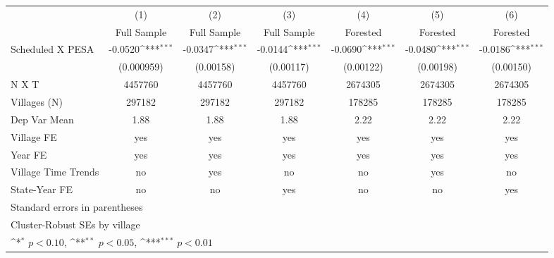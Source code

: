 {
\def\sym#1{\ifmmode^{#1}\else\(^{#1}\)\fi}
\begin{tabular}{l*{6}{c}}
\hline\hline
                    &\multicolumn{1}{c}{(1)}&\multicolumn{1}{c}{(2)}&\multicolumn{1}{c}{(3)}&\multicolumn{1}{c}{(4)}&\multicolumn{1}{c}{(5)}&\multicolumn{1}{c}{(6)}\\
                    &\multicolumn{1}{c}{Full Sample}&\multicolumn{1}{c}{Full Sample}&\multicolumn{1}{c}{Full Sample}&\multicolumn{1}{c}{Forested}&\multicolumn{1}{c}{Forested}&\multicolumn{1}{c}{Forested}\\
\hline
Scheduled X PESA &     -0.0520\sym{***}&     -0.0347\sym{***}&     -0.0144\sym{***}&     -0.0690\sym{***}&     -0.0480\sym{***}&     -0.0186\sym{***}\\
                    &  (0.000959)         &   (0.00158)         &   (0.00117)         &   (0.00122)         &   (0.00198)         &   (0.00150)         \\
\hline
N X T               &     4457760         &     4457760         &     4457760         &     2674305         &     2674305         &     2674305         \\
Villages (N)        &      297182         &      297182         &      297182         &      178285         &      178285         &      178285         \\
Dep Var Mean        &        1.88         &        1.88         &        1.88         &        2.22         &        2.22         &        2.22         \\
Village FE          &         yes         &         yes         &         yes         &         yes         &         yes         &         yes         \\
Year FE             &         yes         &         yes         &         yes         &         yes         &         yes         &         yes         \\
Village Time Trends &          no         &         yes         &          no         &          no         &         yes         &          no         \\
State-Year FE       &          no         &          no         &         yes         &          no         &          no         &         yes         \\
\hline\hline
\multicolumn{7}{l}{\footnotesize Standard errors in parentheses}\\
\multicolumn{7}{l}{\footnotesize Cluster-Robust SEs by village}\\
\multicolumn{7}{l}{\footnotesize \sym{*} \(p<0.10\), \sym{**} \(p<0.05\), \sym{***} \(p<0.01\)}\\
\end{tabular}
}
